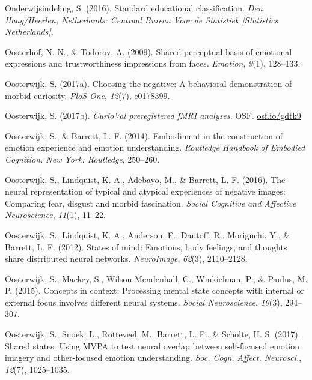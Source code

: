 \documentclass[11pt,american,a4paper,oneside,]{memoir} %
\begin{document}
\leavevmode\hypertarget{ref-Onderwijsindeling2016-tb}{}%
Onderwijsindeling, S. (2016). Standard educational classification. \emph{Den Haag/Heerlen, Netherlands: Centraal Bureau Voor de Statistiek {[}Statistics Netherlands{]}}.

\leavevmode\hypertarget{ref-Oosterhof2009-mf}{}%
Oosterhof, N. N., \& Todorov, A. (2009). Shared perceptual basis of emotional expressions and trustworthiness impressions from faces. \emph{Emotion}, \emph{9}(1), 128--133.

\leavevmode\hypertarget{ref-oosterwijk2017choosing}{}%
Oosterwijk, S. (2017a). Choosing the negative: A behavioral demonstration of morbid curiosity. \emph{PloS One}, \emph{12}(7), e0178399.

\leavevmode\hypertarget{ref-oosterwijk2017prereg}{}%
Oosterwijk, S. (2017b). \emph{CurioVal preregistered fMRI analyses}. OSF. \url{osf.io/gdtk9}

\leavevmode\hypertarget{ref-oosterwijk2014embodiment}{}%
Oosterwijk, S., \& Barrett, L. F. (2014). Embodiment in the construction of emotion experience and emotion understanding. \emph{Routledge Handbook of Embodied Cognition. New York: Routledge}, 250--260.

\leavevmode\hypertarget{ref-oosterwijk2016neural}{}%
Oosterwijk, S., Lindquist, K. A., Adebayo, M., \& Barrett, L. F. (2016). The neural representation of typical and atypical experiences of negative images: Comparing fear, disgust and morbid fascination. \emph{Social Cognitive and Affective Neuroscience}, \emph{11}(1), 11--22.

\leavevmode\hypertarget{ref-oosterwijk2012states}{}%
Oosterwijk, S., Lindquist, K. A., Anderson, E., Dautoff, R., Moriguchi, Y., \& Barrett, L. F. (2012). States of mind: Emotions, body feelings, and thoughts share distributed neural networks. \emph{NeuroImage}, \emph{62}(3), 2110--2128.

\leavevmode\hypertarget{ref-oosterwijk2015concepts}{}%
Oosterwijk, S., Mackey, S., Wilson-Mendenhall, C., Winkielman, P., \& Paulus, M. P. (2015). Concepts in context: Processing mental state concepts with internal or external focus involves different neural systems. \emph{Social Neuroscience}, \emph{10}(3), 294--307.

\leavevmode\hypertarget{ref-Oosterwijk2017-sc}{}%
Oosterwijk, S., Snoek, L., Rotteveel, M., Barrett, L. F., \& Scholte, H. S. (2017). Shared states: Using MVPA to test neural overlap between self-focused emotion imagery and other-focused emotion understanding. \emph{Soc. Cogn. Affect. Neurosci.}, \emph{12}(7), 1025--1035.
\end{document}
